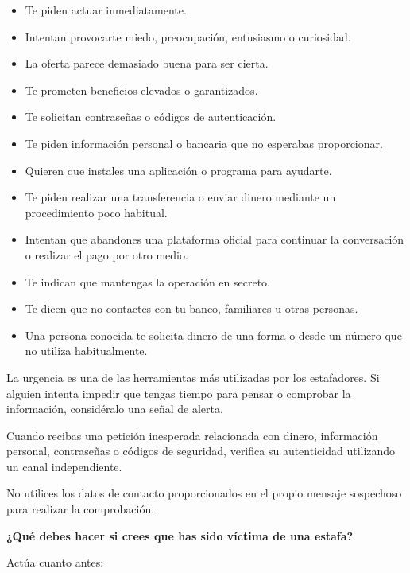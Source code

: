 \documentclass[
  spanish,
  a4paper,
  openany]{book}
\begin{document}
\begin{itemize}
\item
  Te piden actuar inmediatamente.
\item
  Intentan provocarte miedo, preocupación, entusiasmo o curiosidad.
\item
  La oferta parece demasiado buena para ser cierta.
\item
  Te prometen beneficios elevados o garantizados.
\item
  Te solicitan contraseñas o códigos de autenticación.
\item
  Te piden información personal o bancaria que no esperabas proporcionar.
\item
  Quieren que instales una aplicación o programa para ayudarte.
\item
  Te piden realizar una transferencia o enviar dinero mediante un procedimiento poco habitual.
\item
  Intentan que abandones una plataforma oficial para continuar la conversación o realizar el pago por otro medio.
\item
  Te indican que mantengas la operación en secreto.
\item
  Te dicen que no contactes con tu banco, familiares u otras personas.
\item
  Una persona conocida te solicita dinero de una forma o desde un número que no utiliza habitualmente.
\end{itemize}

La urgencia es una de las herramientas más utilizadas por los estafadores. Si alguien intenta impedir que tengas tiempo para pensar o comprobar la información, considéralo una señal de alerta.

Cuando recibas una petición inesperada relacionada con dinero, información personal, contraseñas o códigos de seguridad, verifica su autenticidad utilizando un canal independiente.

No utilices los datos de contacto proporcionados en el propio mensaje sospechoso para realizar la comprobación.

\textbf{¿Qué debes hacer si crees que has sido víctima de una estafa?}

Actúa cuanto antes:
\end{document}
